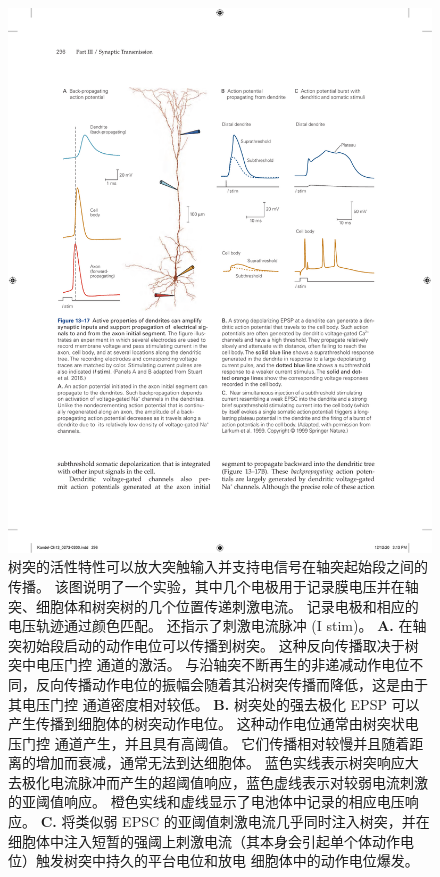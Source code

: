 \begin{figure}[htbp]
	\centering
	\includegraphics[width=0.95\linewidth]{chap13/fig_13_17}
	\caption{树突的活性特性可以放大突触输入并支持电信号在轴突起始段之间的传播。
		该图说明了一个实验，其中几个电极用于记录膜电压并在轴突、细胞体和树突树的几个位置传递刺激电流。
		记录电极和相应的电压轨迹通过颜色匹配。 还指示了刺激电流脉冲 (I stim)\cite{stuart2016dendrites}。
		\textbf{A.} 在轴突初始段启动的动作电位可以传播到树突。
		这种反向传播取决于树突中电压门控  通道的激活。
		与沿轴突不断再生的非递减动作电位不同，反向传播动作电位的振幅会随着其沿树突传播而降低，这是由于其电压门控  通道密度相对较低。
		\textbf{B.} 树突处的强去极化 EPSP 可以产生传播到细胞体的树突动作电位。
		这种动作电位通常由树突状电压门控  通道产生，并且具有高阈值。
		它们传播相对较慢并且随着距离的增加而衰减，通常无法到达细胞体。
		蓝色实线表示树突响应大去极化电流脉冲而产生的超阈值响应，蓝色虚线表示对较弱电流刺激的亚阈值响应。
		橙色实线和虚线显示了电池体中记录的相应电压响应。
		\textbf{C.} 将类似弱 EPSC 的亚阈值刺激电流几乎同时注入树突，并在细胞体中注入短暂的强阈上刺激电流（其本身会引起单个体动作电位）触发树突中持久的平台电位和放电 细胞体中的动作电位爆发\cite{larkum1999new}。}
	\label{fig:13_17}
\end{figure}


